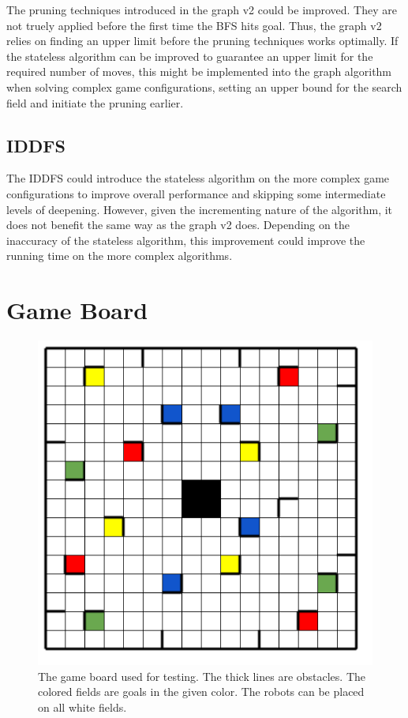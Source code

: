 \documentclass[]{article}
\begin{document}
The pruning techniques introduced in the graph v2 could be improved.
They are not truely applied before the first time the BFS hits goal.
Thus, the graph v2 relies on finding an upper limit before the pruning
techniques works optimally. If the stateless algorithm can be improved
to guarantee an upper limit for the required number of moves, this might
be implemented into the graph algorithm when solving complex game
configurations, setting an upper bound for the search field and initiate
the pruning earlier.

\subsection{IDDFS}\label{iddfs}

The IDDFS could introduce the stateless algorithm on the more complex
game configurations to improve overall performance and skipping some
intermediate levels of deepening. However, given the incrementing nature
of the algorithm, it does not benefit the same way as the graph v2 does.
Depending on the inaccuracy of the stateless algorithm, this improvement
could improve the running time on the more complex algorithms.

\newpage

\appendix
\section{Game Board} \label{app:gameboard}

\begin{figure}[h]
\centering
\includegraphics[height=1\textheight,width=1\textwidth,keepaspectratio]{img/gameboard.png}
\caption{The game board used for testing. The thick lines are obstacles. The colored fields are goals in the given color. The robots can be placed on all white fields.}
\label{fig:gameboard}
\end{figure}\newpage
\end{document}
